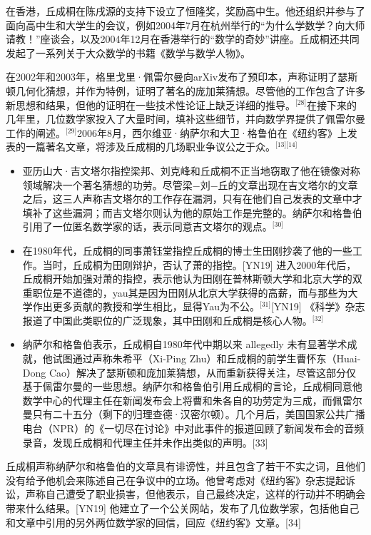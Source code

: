 在香港，丘成桐在陈戌源的支持下设立了恒隆奖，奖励高中生。他还组织并参与了面向高中生和大学生的会议，例如2004年7月在杭州举行的“为什么学数学？向大师请教！”座谈会，以及2004年12月在香港举行的“数学的奇妙”讲座。丘成桐还共同发起了一系列关于大众数学的书籍《数学与数学人物》。

在2002年和2003年，格里戈里·佩雷尔曼向arXiv发布了预印本，声称证明了瑟斯顿几何化猜想，并作为特例，证明了著名的庞加莱猜想。尽管他的工作包含了许多新思想和结果，但他的证明在一些技术性论证上缺乏详细的推导。\(^\text{[28]}\)在接下来的几年里，几位数学家投入了大量时间，填补这些细节，并向数学界提供了佩雷尔曼工作的阐述。\(^\text{[29]}\)2006年8月，西尔维亚·纳萨尔和大卫·格鲁伯在《纽约客》上发表的一篇著名文章，将涉及丘成桐的几场职业争议公之于众。\(^\text{[13][14]}\)
\begin{itemize}
\item 亚历山大·吉文塔尔指控梁邦、刘克峰和丘成桐不正当地窃取了他在镜像对称领域解决一个著名猜想的功劳。尽管梁−刘−丘的文章出现在吉文塔尔的文章之后，这三人声称吉文塔尔的工作存在漏洞，只有在他们自己发表的文章中才填补了这些漏洞；而吉文塔尔则认为他的原始工作是完整的。纳萨尔和格鲁伯引用了一位匿名数学家的话，表示同意吉文塔尔的观点。\(^\text{[30]}\)
\item 在1980年代，丘成桐的同事萧钰堂指控丘成桐的博士生田刚抄袭了他的一些工作。当时，丘成桐为田刚辩护，否认了萧的指控。[YN19] 进入2000年代后，丘成桐开始加强对萧的指控，表示他认为田刚在普林斯顿大学和北京大学的双重职位是不道德的，yau其是因为田刚从北京大学获得的高薪，而与那些为大学作出更多贡献的教授和学生相比，显得Yau为不公。\(^\text{[31]}\)[YN19] 《科学》杂志报道了中国此类职位的广泛现象，其中田刚和丘成桐是核心人物。\(^\text{[32]}\) 
\item 纳萨尔和格鲁伯表示，丘成桐自1980年代中期以来 allegedly 未有显著学术成就，他试图通过声称朱希平（Xi-Ping Zhu）和丘成桐的前学生曹怀东（Huai-Dong Cao）解决了瑟斯顿和庞加莱猜想，从而重新获得关注，尽管这部分仅基于佩雷尔曼的一些思想。纳萨尔和格鲁伯引用丘成桐的言论，丘成桐同意他数学中心的代理主任在新闻发布会上将曹和朱各自的功劳定为三成，而佩雷尔曼只有二十五分（剩下的归理查德·汉密尔顿）。几个月后，美国国家公共广播电台（NPR）的《一切尽在讨论》中对此事件的报道回顾了新闻发布会的音频录音，发现丘成桐和代理主任并未作出类似的声明。[33]
\end{itemize}
丘成桐声称纳萨尔和格鲁伯的文章具有诽谤性，并且包含了若干不实之词，且他们没有给予他机会来陈述自己在争议中的立场。他曾考虑对《纽约客》杂志提起诉讼，声称自己遭受了职业损害，但他表示，自己最终决定，这样的行动并不明确会带来什么结果。[YN19] 他建立了一个公关网站，发布了几位数学家，包括他自己和文章中引用的另外两位数学家的回信，回应《纽约客》文章。[34]

